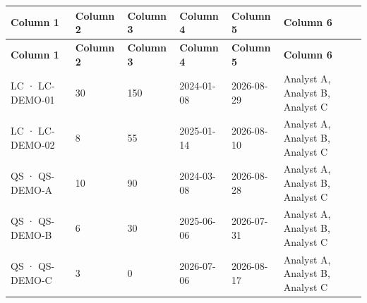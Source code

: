 {\footnotesize
\begin{longtable}{@{}llllll@{}}
\toprule \textbf{Column 1} & \textbf{Column 2} & \textbf{Column 3} & \textbf{Column 4} & \textbf{Column 5} & \textbf{Column 6} \\\midrule\endfirsthead
\toprule \textbf{Column 1} & \textbf{Column 2} & \textbf{Column 3} & \textbf{Column 4} & \textbf{Column 5} & \textbf{Column 6} \\\midrule\endhead
LC · LC-DEMO-01 & 30 & 150 & 2024-01-08 & 2026-08-29 & Analyst A, Analyst B, Analyst C \\\hline
LC · LC-DEMO-02 & 8 & 55 & 2025-01-14 & 2026-08-10 & Analyst A, Analyst B, Analyst C \\\hline
QS · QS-DEMO-A & 10 & 90 & 2024-03-08 & 2026-08-28 & Analyst A, Analyst B, Analyst C \\\hline
QS · QS-DEMO-B & 6 & 30 & 2025-06-06 & 2026-07-31 & Analyst A, Analyst B, Analyst C \\\hline
QS · QS-DEMO-C & 3 & 0 & 2026-07-06 & 2026-08-17 & Analyst A, Analyst B, Analyst C \\\hline
\bottomrule
\end{longtable}}

